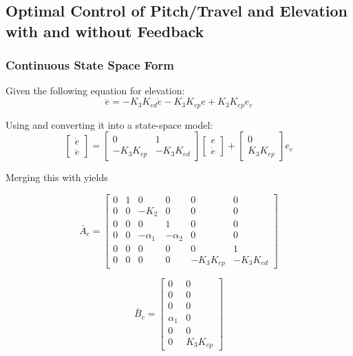 
\subsection{Optimal Control of Pitch/Travel and Elevation with and without Feedback}
\subsubsection{Continuous State Space Form}
Given the following equation for elevation:
\begin{equation}\label{eq:elevation}
\ddot{e} = -K_3K_{ed}\dot{e} - K_3K_{ep}e +K_3K_{ep}e_c
\end{equation}

Using  and converting it into a state-space model:
$$
\begin{bmatrix}
\dot{e} \\
\ddot{e}
\end{bmatrix} = \begin{bmatrix}
0 & 1 \\
-K_3K_{ep} & -K_3K_{ed}
\end{bmatrix}\begin{bmatrix}
e \\
\dot{e}
\end{bmatrix}
+\begin{bmatrix}
0 \\
K_3K_{ep}
\end{bmatrix}e_c
$$

Merging this with  yields

\begin{equation}
\bar{A}_c =
\begin{bmatrix}
    0 & 1 & 0 & 0 & 0 & 0 \\
    0 & 0 & -K_2 & 0 & 0 & 0 \\
    0 & 0 & 0 & 1 & 0 & 0 \\
    0 & 0 & -\alpha_1 & - \alpha_2 & 0 & 0 \\
    0 & 0 & 0 & 0 & 0 & 1 \\
    0 & 0 & 0 & 0 & -K_3K_{ep} & -K_3K_{ed}
\end{bmatrix}
\end{equation}

\begin{equation}
\bar{B}_c =
\begin{bmatrix}
    0 & 0\\
    0 & 0 \\
    0 & 0 \\
    \alpha_1 & 0 \\
    0 & 0 \\
    0 & K_3K_{ep}
\end{bmatrix}
\end{equation}

